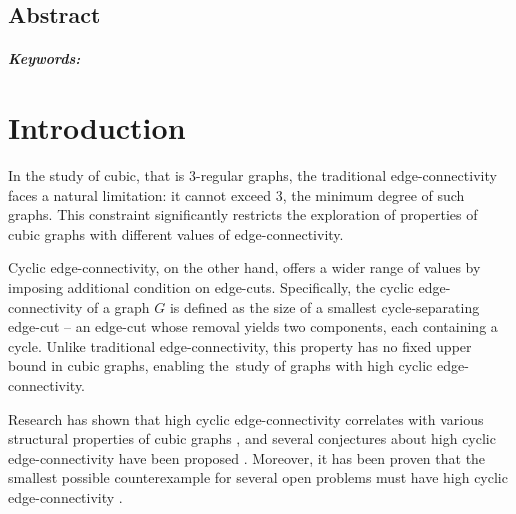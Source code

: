 \documentclass[12pt, twoside]{book}
\begin{document}
\newpage

\begin{otherlanguage}{USenglish}
    \section*{Abstract}

    \thesisabstracten{}

    \paragraph*{Keywords:} \thesiskeywordsen{}
\end{otherlanguage}

\newpage
\tableofcontents

\newpage
\listoffigures

\mainmatter{}

\chapter*{Introduction}

In the study of cubic, that is 3-regular graphs, the traditional edge-connectivity faces a natural limitation: it cannot exceed 3, the minimum degree of such graphs. This constraint significantly restricts the exploration of properties of cubic graphs with different values of edge-connectivity.

Cyclic edge-connectivity, on the other hand, offers a wider range of values by imposing additional condition on edge-cuts. Specifically, the cyclic edge-connectivity of a graph $G$ is defined as the size of a smallest cycle-separating edge-cut -- an edge-cut whose removal yields two components, each containing a cycle. Unlike traditional edge-connectivity, this property has no fixed upper bound in cubic graphs, enabling the~study of graphs with high cyclic edge-connectivity.

Research has shown that high cyclic \mbox{edge-connectivity} correlates with various structural properties of cubic graphs \cite{Andersen1988, Doslic2003, McCuaig1992, Thomassen1983}, and several conjectures about high cyclic edge-connectivity have been proposed \cite{Fleischner1988, jaeger1980conjecture, Thomassen1986}. Moreover, it has been proven that the smallest possible counterexample for several open problems must have high cyclic edge-connectivity \cite{Kochol2004, Macajova2020}.
\end{document}
